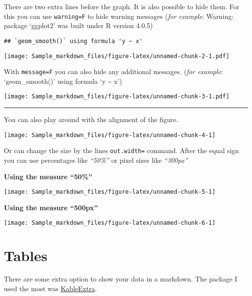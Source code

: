 \documentclass[]{article}
\begin{document}
There are two extra lines before the graph. It is also possible to hide
them. For this you can use \texttt{warning=F} to hide warning messages
(\emph{for example}: Warning: package `ggplot2' was built under R
version 4.0.5)

\begin{verbatim}
## `geom_smooth()` using formula 'y ~ x'
\end{verbatim}

\texttt{[image: Sample\_markdown\_files/figure-latex/unnamed-chunk-2-1.pdf]}

With \texttt{message=F} you can also hide any additional messages.
(\emph{for example}: `geom\_smooth()' using formula `y \textasciitilde{}
x')

\texttt{[image: Sample\_markdown\_files/figure-latex/unnamed-chunk-3-1.pdf]}

\begin{center}\rule{0.5\linewidth}{0.5pt}\end{center}

You can also play around with the alignment of the figure.

\begin{center}\texttt{[image: Sample\_markdown\_files/figure-latex/unnamed-chunk-4-1]} \end{center}

Or can change the size by the lines \texttt{out.width=} command. After
the equal sign you can use percentages like \emph{``50\%''} or pixel
sizes like \emph{``300px''}

\textbf{Using the measure ``50\%''}

\begin{flushright}\texttt{[image: Sample\_markdown\_files/figure-latex/unnamed-chunk-5-1]} \end{flushright}

\textbf{Using the measure ``500px''}

\begin{center}\texttt{[image: Sample\_markdown\_files/figure-latex/unnamed-chunk-6-1]} \end{center}

\hypertarget{tables}{%
\section{Tables}\label{tables}}

There are some extra option to show your data in a markdown. The package
I used the most was
\href{https://cran.r-project.org/web/packages/kableExtra/vignettes/awesome_table_in_html.html}{KableExtra}.
\end{document}
